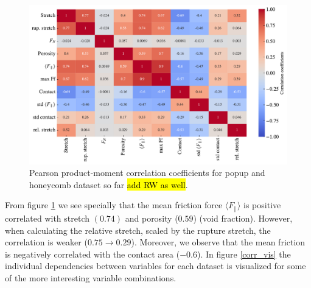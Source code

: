 \begin{figure}[H]
  \centering
  \includegraphics[width=\linewidth]{figures/ML/corrcoef_matrix.pdf}
  \caption{Pearson product-moment correlation coefficients for popup and honeycomb dataset so far \hl{add RW as well}.}
  \label{fig:corrcoef_matrix}
\end{figure}

From figure \ref{fig:corrcoef_matrix} we see specially that the mean friction force $\langle F_{\parallel} \rangle$ is positive correlated with stretch $(0.74)$ and porosity ($0.59$) (void fraction). However, when calculating the relative stretch, scaled by the rupture stretch, the correlation is weaker ($0.75 \to 0.29$). Moreover, we observe that the mean friction is negatively correlated with the contact area ($-0.6$). In figure \ref{corr_vis} the individual dependencies between variables for each dataset is visualized for some of the more interesting variable combinations.


